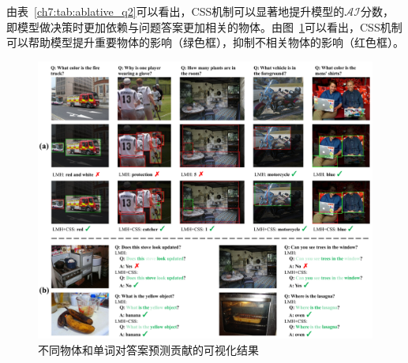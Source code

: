 \begin{table}[tbp]
    \begin{center}
    \end{center}
    \caption{数据集VQA-CP-Rephrasing测试集的$CS(k)$和数据集VQA-CP v2测试集的$\mathcal{CI}$分数}
    \label{ch7:tab:ablative_q3}
\end{table}

由表~\ref{ch7:tab:ablative_q2}可以看出，CSS机制可以显著地提升模型的$\mathcal{AI}$分数，即模型做决策时更加依赖与问题答案更加相关的物体。由图~\ref{ch7:fig:visualization}可以看出，CSS机制可以帮助模型提升重要物体的影响（绿色框），抑制不相关物体的影响（红色框）。

\begin{figure}[t]
    \centering
        \includegraphics[width=\linewidth]{chapter7/res/visualization.pdf}
    \caption{不同物体和单词对答案预测贡献的可视化结果}
    \label{ch7:fig:visualization}
\end{figure}


